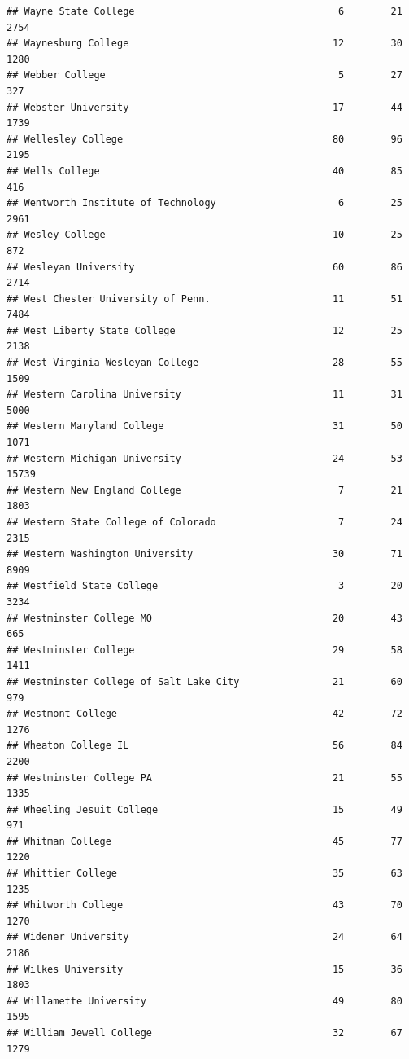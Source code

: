 \documentclass[
]{article}
\begin{document}
\begin{verbatim}
## Wayne State College                                   6        21        2754
## Waynesburg College                                   12        30        1280
## Webber College                                        5        27         327
## Webster University                                   17        44        1739
## Wellesley College                                    80        96        2195
## Wells College                                        40        85         416
## Wentworth Institute of Technology                     6        25        2961
## Wesley College                                       10        25         872
## Wesleyan University                                  60        86        2714
## West Chester University of Penn.                     11        51        7484
## West Liberty State College                           12        25        2138
## West Virginia Wesleyan College                       28        55        1509
## Western Carolina University                          11        31        5000
## Western Maryland College                             31        50        1071
## Western Michigan University                          24        53       15739
## Western New England College                           7        21        1803
## Western State College of Colorado                     7        24        2315
## Western Washington University                        30        71        8909
## Westfield State College                               3        20        3234
## Westminster College MO                               20        43         665
## Westminster College                                  29        58        1411
## Westminster College of Salt Lake City                21        60         979
## Westmont College                                     42        72        1276
## Wheaton College IL                                   56        84        2200
## Westminster College PA                               21        55        1335
## Wheeling Jesuit College                              15        49         971
## Whitman College                                      45        77        1220
## Whittier College                                     35        63        1235
## Whitworth College                                    43        70        1270
## Widener University                                   24        64        2186
## Wilkes University                                    15        36        1803
## Willamette University                                49        80        1595
## William Jewell College                               32        67        1279

\end{verbatim}
\end{document}
